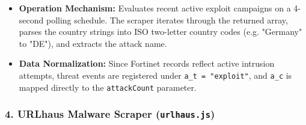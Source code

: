 \begin{itemize}
    \item \textbf{Operation Mechanism:} Evaluates recent active exploit campaigns on a 4-second polling schedule. The scraper iterates through the returned array, parses the country strings into ISO two-letter country codes (e.g. "Germany" to "DE"), and extracts the attack name.
    \item \textbf{Data Normalization:} Since Fortinet records reflect active intrusion attempts, threat events are registered under \texttt{a\_t = "exploit"}, and \texttt{a\_c} is mapped directly to the \texttt{attackCount} parameter.
\end{itemize}

\subsubsection{4. URLhaus Malware Scraper (\texttt{urlhaus.js})}
